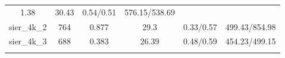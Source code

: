 \documentclass[]{article}
\begin{document}
\begin{longtable}[]{@{}cccccc@{}}
\begin{minipage}[t]{0.12\columnwidth}
1.38\strut
\end{minipage} & \begin{minipage}[t]{0.14\columnwidth}\centering\strut
30.43\strut
\end{minipage} & \begin{minipage}[t]{0.17\columnwidth}\centering\strut
0.54/0.51\strut
\end{minipage} & \begin{minipage}[t]{0.22\columnwidth}\centering\strut
576.15/538.69\strut
\end{minipage}\tabularnewline
\begin{minipage}[t]{0.12\columnwidth}\centering\strut
sier\_4k\_2\strut
\end{minipage} & \begin{minipage}[t]{0.07\columnwidth}\centering\strut
764\strut
\end{minipage} & \begin{minipage}[t]{0.12\columnwidth}\centering\strut
0.877\strut
\end{minipage} & \begin{minipage}[t]{0.14\columnwidth}\centering\strut
29.3\strut
\end{minipage} & \begin{minipage}[t]{0.17\columnwidth}\centering\strut
0.33/0.57\strut
\end{minipage} & \begin{minipage}[t]{0.22\columnwidth}\centering\strut
499.43/854.98\strut
\end{minipage}\tabularnewline
\begin{minipage}[t]{0.12\columnwidth}\centering\strut
sier\_4k\_3\strut
\end{minipage} & \begin{minipage}[t]{0.07\columnwidth}\centering\strut
688\strut
\end{minipage} & \begin{minipage}[t]{0.12\columnwidth}\centering\strut
0.383\strut
\end{minipage} & \begin{minipage}[t]{0.14\columnwidth}\centering\strut
26.39\strut
\end{minipage} & \begin{minipage}[t]{0.17\columnwidth}\centering\strut
0.48/0.59\strut
\end{minipage} & \begin{minipage}[t]{0.22\columnwidth}\centering\strut
454.23/499.15\strut
\end{minipage}\tabularnewline
\begin{minipage}[t]{0.12\columnwidth}\centering\strut

\end{minipage}
\end{longtable}
\end{document}

